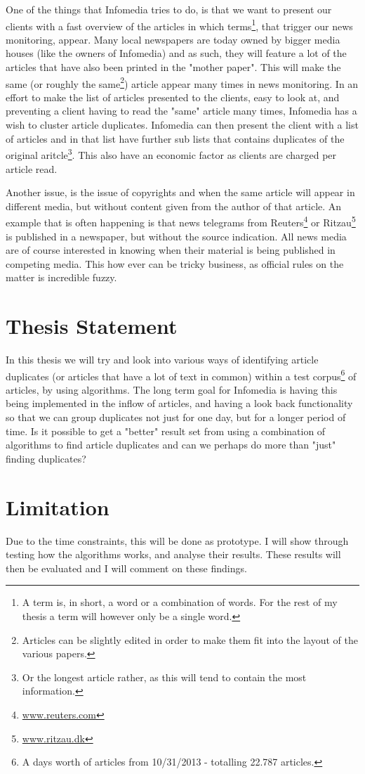 One of the things that Infomedia tries to do, is that we want to present our clients with a fast overview of the articles in which terms\footnote{A term is, in short, a word or a combination of words. For the rest of my thesis a term will however only be a single word.}, that trigger our news monitoring, appear. Many local newspapers are today owned by bigger media houses (like the owners of Infomedia) and as such, they will feature a lot of the articles that have also been printed in the "mother paper". This will make the same (or roughly the same\footnote{Articles can be slightly edited in order to make them fit into the layout of the various papers.}) article appear many times in news monitoring. In an effort to make the list of articles presented to the clients, easy to look at, and preventing a client having to read the "same" article many times, Infomedia has a wish to cluster article duplicates. Infomedia can then present the client with a list of articles and in that list have further sub lists that contains duplicates of the original aritcle\footnote{Or the longest article rather, as this will tend to contain the most information.}. This also have an economic factor as clients are charged per article read.

Another issue, is the issue of copyrights and when the same article will appear in different media, but without content given from the author of that article. An example that is often happening is that news telegrams from Reuters\footnote{\url{www.reuters.com}} or Ritzau\footnote{\url{www.ritzau.dk}} is published in a newspaper, but without the source indication. All news media are of course interested in knowing when their material is being published in competing media. This how ever can be tricky business, as official rules on the matter is incredible fuzzy.

\section{Thesis Statement}

In this thesis we will try and look into various ways of identifying article duplicates (or articles that have a lot of text in common) within a test corpus\footnote{A days worth of articles from 10/31/2013 - totalling 22.787 articles.} of articles, by using algorithms. The long term goal for Infomedia is having this being implemented in the inflow of articles, and having a look back functionality so that we can group duplicates not just for one day, but for a longer period of time. Is it possible to get a "better" result set from using a combination of algorithms to find article duplicates and can we perhaps do more than "just" finding duplicates?

\section{Limitation}
Due to the time constraints, this will be done as prototype. I will show through testing how the algorithms works, and analyse their results. These results will then be evaluated and I will comment on these findings.